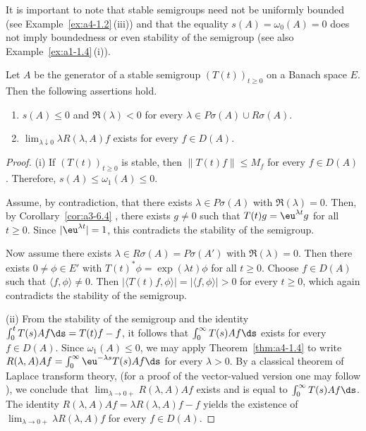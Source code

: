 It is important to note  that stable semigroups need not be uniformly bounded (see Example~\ref{ex:a4-1.2}\,(iii)) and that the equality $ s(A) = \omega_{0}(A) = 0 $ does not imply boundedness or even stability of the semigroup (see also Example~\ref{ex:a1-1.4}\,(i)).
\begin{theorem} \label{thm:a4-1.13} 
Let $ A $ be the generator of a stable semigroup $ (T(t))_{t \geq 0} $ on a Banach space $ E $. Then the following assertions hold.
\begin{enumerate}[\upshape (i)]
    \item 
    $ s(A) \leq 0 $ and $ \Re(\lambda) < 0 $ for every $ \lambda \in P\sigma (A) \cup R\sigma(A) $.
    
    \item 
    $ \lim_{\lambda \downarrow 0} \lambda R(\lambda, A) f $ exists for every $ f \in D(A) $.
\end{enumerate}
\end{theorem}
\begin{proof} (i) If\/ $ (T(t))_{t \geq 0} $ is stable, then $ \|T(t) f\| \leq M_f $ for every $ f \in D(A) $. Therefore, $ s(A) \leq \omega_1(A) \leq 0 $. 

Assume, by contradiction, that there exists $ \lambda \in P\sigma(A) $ with $ \Re(\lambda) = 0 $. 
Then, by Corollary~\ref{cor:a3-6.4} , there exists $ g \neq 0 $ such that $ T(t) g = \eu^{\lambda t} g $ for all $ t \geq 0 $. Since $ |\eu^{\lambda t}| = 1 $, this contradicts the stability of the semigroup. 

Now assume there exists $ \lambda \in R\sigma(A) = P\sigma(A') $ with $ \Re(\lambda) = 0 $. 
Then there exists $ 0 \neq \phi \in E' $ with $ T(t)^* \phi = \exp(\lambda t) \phi $ for all $ t \geq 0 $. Choose $ f \in D(A) $ such that $ \langle f, \phi \rangle \neq 0 $. 
Then $ |\langle T(t) f, \phi \rangle| = | \langle f, \phi \rangle| > 0 $ for every $ t \geq 0 $, which again contradicts the stability of the semigroup.

(ii) From the stability of the semigroup and the identity   $\int_{0}^{t} T(s) A f  \ds = T(t) f - f$, it follows that  
$\int_{0}^{\infty} T(s) A f  \ds$ exists for every $ f \in D(A) $.  
Since $ \omega_1(A) \leq 0 $, we may apply Theorem~\ref{thm:a4-1.4} to write  $ R(\lambda, A) A f = \int_{0}^{\infty} \eu^{-\lambda s} T(s) A f  \ds $ for every $ \lambda > 0 $. 
By a classical theorem of Laplace transform theory, (for a proof of the vector-valued version one may follow \textcite[p.196]{widder:1971}), we conclude that $\lim_{\lambda \to 0+} R(\lambda,A)Af$ exists
and is equal to $\int_{0}^{\infty} T(s)Af  \ds$. 
The identity $R(\lambda,A)Af = \lambda R(\lambda,A)f - f$
yields the existence of\/ $\lim_{\lambda \to 0+} \lambda R(\lambda,A)f$ for every $f \in D(A)$.
\end{proof}

